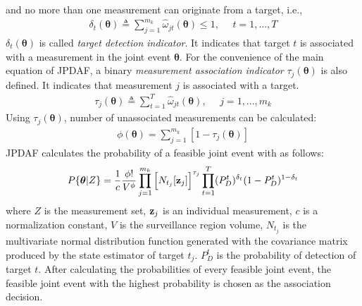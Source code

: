 \documentclass{article}
\newcommand{\btheta}{\boldsymbol{\theta}}
\begin{document}
and no more than one measurement can originate from a target, i.e.,
\begin{gather}
\delta_t(\btheta)\triangleq\sum_{j=1}^{m_k}\hat{\omega}_{jt}(\btheta)\leq1,~~~~~~t=1,...,T
\end{gather}
$\delta_t(\btheta)$ is called \textit{target detection indicator}. It indicates that target $t$ is associated with a measurement in the joint event $\btheta$. For the convenience of the main equation of JPDAF, a binary \textit{measurement association indicator} $\tau_j(\btheta)$ is also defined. It indicates that measurement $j$ is associated with a target.
\begin{gather}
\tau_j(\btheta)\triangleq\sum_{t=1}^{T}\hat{\omega}_{jt}(\btheta),~~~~~~j=1,...,m_k
\end{gather}
Using $\tau_j(\btheta)$, number of unassociated measurements can be calculated:
\begin{gather}
\phi(\btheta)=\sum_{j=1}^{m_k}[1-\tau_j(\btheta)]
\end{gather}
JPDAF calculates the probability of a feasible joint event with as follows:
\begin{gather}
P\{\btheta|Z\}=\frac{1}{c} \dfrac{\phi!}{V^\phi} \prod_{j=1}^{m_k}\Big[N_{t_j}[\bold{z}_j]\Big]^{\tau_j} \prod_{t=1}^T (P^t_D)^{\delta_t}(1-P^t_D)^{1-\delta_t}
\end{gather}
where $Z$ is the measurement set, $\bold{z}_j$ is an individual measurement, $c$ is a normalization constant, $V$ is the surveillance region volume, $N_{t_j}$ is the multivariate normal distribution function generated with the covariance matrix produced by the state estimator of target $t_j$. $P^t_D$ is the probability of detection of target $t$. After calculating the probabilities of every feasible joint event, the feasible joint event with the highest probability is chosen as the association decision.


\end{document}
